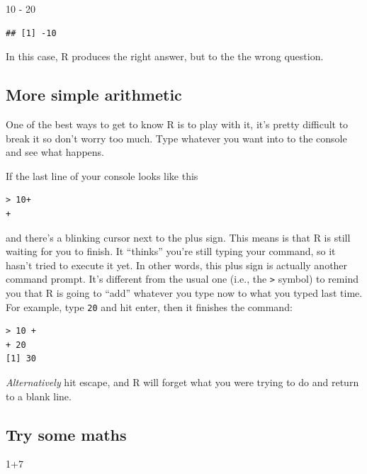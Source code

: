 \documentclass[
]{book}
\newenvironment{Shaded}{\begin{snugshade}}{\end{snugshade}}
\newcommand{\DecValTok}[1]{\textcolor[rgb]{0.00,0.00,0.81}{#1}}
\newcommand{\SpecialCharTok}[1]{\textcolor[rgb]{0.00,0.00,0.00}{#1}}
\begin{document}
\begin{Shaded}
\begin{Highlighting}[]
\DecValTok{10} \SpecialCharTok{{-}} \DecValTok{20}
\end{Highlighting}
\end{Shaded}

\begin{verbatim}
## [1] -10
\end{verbatim}

In this case, R produces the right answer, but to the the wrong question.

\hypertarget{more-simple-arithmetic}{%
\subsection{More simple arithmetic}\label{more-simple-arithmetic}}

One of the best ways to get to know R is to play with it, it's pretty difficult to break it so don't worry too much. Type whatever you want into to the console and see what happens.

If the last line of your console looks like this

\begin{verbatim}
> 10+
+ 
\end{verbatim}

and there's a blinking cursor next to the plus sign. This means is that R is still waiting for you to finish. It ``thinks'' you're still typing your command, so it hasn't tried to execute it yet. In other words, this plus sign is actually another command prompt. It's different from the usual one (i.e., the \texttt{\textgreater{}} symbol) to remind you that R is going to ``add'' whatever you type now to what you typed last time. For example, type \texttt{20} and hit enter, then it finishes the command:

\begin{verbatim}
> 10 +
+ 20
[1] 30
\end{verbatim}

\emph{Alternatively} hit escape, and R will forget what you were trying to do and return to a blank line.

\hypertarget{try-some-maths}{%
\subsection{Try some maths}\label{try-some-maths}}

\begin{Shaded}
\begin{Highlighting}[]
\DecValTok{1}\SpecialCharTok{+}\DecValTok{7}
\end{Highlighting}
\end{Shaded}
\end{document}
